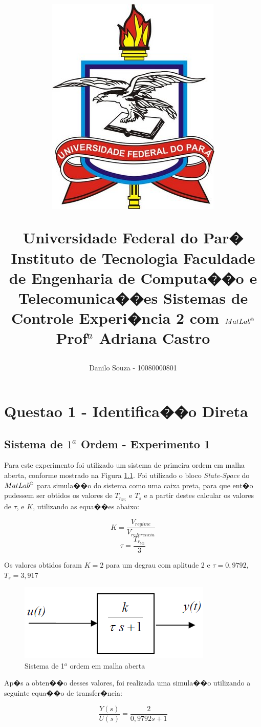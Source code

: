 \documentclass[11pt,a4paper]{report}
\title{	\begin{figure}[h]
			\centering
			\includegraphics[scale=0.75]{./pictures/logoufpa.png}
			\label{fig:logoufpa}
		\end{figure}
		Universidade Federal do Par� \linebreak
		Instituto de Tecnologia \linebreak
		Faculdade de Engenharia de Computa��o e Telecomunica��es \linebreak
		Sistemas de Controle \linebreak
		Experi�ncia 2 com $MatLab^{\copyright}$ \linebreak
		Prof$^{a}$ Adriana Castro}
\begin{document}
\author{Danilo Souza - 10080000801}
\maketitle

\tableofcontents
\listoffigures

\chapter{Questao 1 - Identifica��o Direta}

\section{Sistema de $1^{a}$ Ordem - Experimento 1}

	Para este experimento foi utilizado um sistema de primeira ordem em malha aberta, conforme mostrado na Figura \ref{fig:sist1ordaberta}. Foi utilizado o bloco \textit{State-Space} do $MatLab^{\copyright}$ para simula��o do sistema como uma caixa preta, para que ent�o pudessem ser obtidos os valores de $T_{r_{5\%}}$ e $T_{s}$ e a partir destes calcular os valores de $\tau$, e $K$, utilizando as equa��es abaixo:
	
	\[K = \frac{V_{regime}}{V_{referencia}}\]  \[\tau = \frac{T_{r_{5\%}}}{3} \]
	
	Os valores obtidos foram $K = 2$ para um degrau com aplitude 2 e $\tau = 0,9792$, $T_{s} = 3,917$

		\begin{figure}[h]
			\centering
			\includegraphics[scale=0.75]{./pictures/sistema_1ordem_aberta.png}
			\caption{Sistema de 1$^{a}$ ordem em malha aberta}
			\label{fig:sist1ordaberta}			
		\end{figure}
	
	Ap�s a obten��o desses valores, foi realizada uma simula��o utilizando a seguinte equa��o de transfer�ncia:
	
	\[ \frac{Y(s)}{U(s)} = \frac{2}{0,9792s +1} \]
	
\end{document}
